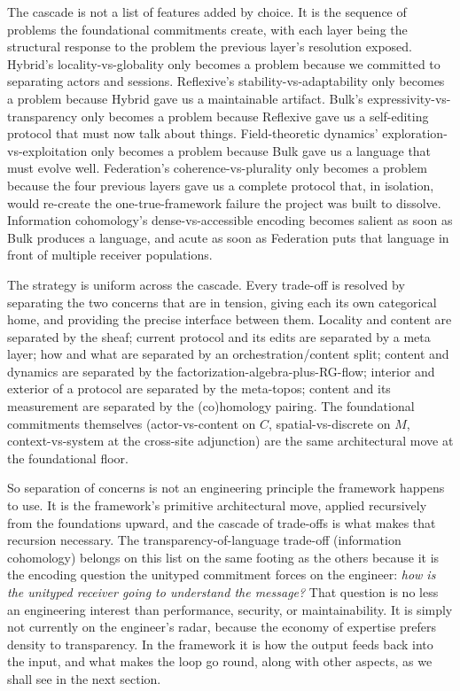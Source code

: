 \documentclass[11pt]{article}
\begin{document}
The cascade is not a list of features added by choice. It is the sequence of
problems the foundational commitments create, with each layer being the
structural response to the problem the previous layer's resolution exposed.
Hybrid's locality-vs-globality only becomes a problem because we committed to
separating actors and sessions. Reflexive's stability-vs-adaptability only
becomes a problem because Hybrid gave us a maintainable artifact. Bulk's
expressivity-vs-transparency only becomes a problem because Reflexive gave us a
self-editing protocol that must now talk about things. Field-theoretic
dynamics' exploration-vs-exploitation only becomes a problem because Bulk gave
us a language that must evolve well. Federation's coherence-vs-plurality only
becomes a problem because the four previous layers gave us a complete protocol
that, in isolation, would re-create the one-true-framework failure the project
was built to dissolve. Information cohomology's dense-vs-accessible encoding
becomes salient as soon as Bulk produces a language, and acute as soon as
Federation puts that language in front of multiple receiver populations.

The strategy is uniform across the cascade. Every trade-off is resolved by
separating the two concerns that are in tension, giving each its own
categorical home, and providing the precise interface between them. Locality
and content are separated by the sheaf; current protocol and its edits are
separated by a meta layer; how and what are separated by an
orchestration/content split; content and dynamics are separated by the
factorization-algebra-plus-RG-flow; interior and exterior of a protocol are
separated by the meta-topos; content and its measurement are separated by the
(co)homology pairing. The foundational commitments themselves
(actor-vs-content on \(C\), spatial-vs-discrete on \(M\), context-vs-system at
the cross-site adjunction) are the same architectural move at the foundational
floor.

So separation of concerns is not an engineering principle the framework
happens to use. It is the framework's primitive architectural move, applied
recursively from the foundations upward, and the cascade of trade-offs is what
makes that recursion necessary. The transparency-of-language trade-off
(information cohomology) belongs on this list on the same footing as the others
because it is the encoding question the unityped commitment forces on the
engineer: \emph{how is the unityped receiver going to understand the message?}
That question is no less an engineering interest than performance, security,
or maintainability. It is simply not currently on the engineer's radar, because
the economy of expertise prefers density to transparency. In the framework it
is how the output feeds back into the input, and what makes the loop go round,
along with other aspects, as we shall see in the next section.
\end{document}
